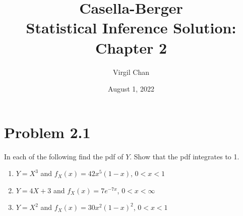 \documentclass[12pt,letterpaper,reqno]{amsart}
\author{Virgil Chan}
\title{Casella-Berger \\ Statistical Inference Solution: \\ Chapter 2}
\date{August 1, 2022}
\numberwithin{equation}{subsection}
\begin{document}
\maketitle

\tableofcontents

\newpage
\section{Problem 2.1}

In each of the following find the pdf of $Y$. Show that the pdf integrates to 1.

\begin{enumerate}[label=(\alph*),leftmargin=*]
    \item $Y = X^3$ and $f_X(x) = 42x^5(1-x)$, $0<x<1$
    \item $Y = 4X+3$ and $f_X(x) = 7e^{-7x}$, $0< x < \infty$
    \item $Y = X^2$ and $f_X(x) = 30x^2(1-x)^2$, $0< x< 1$
\end{enumerate}~\\
\end{document}

